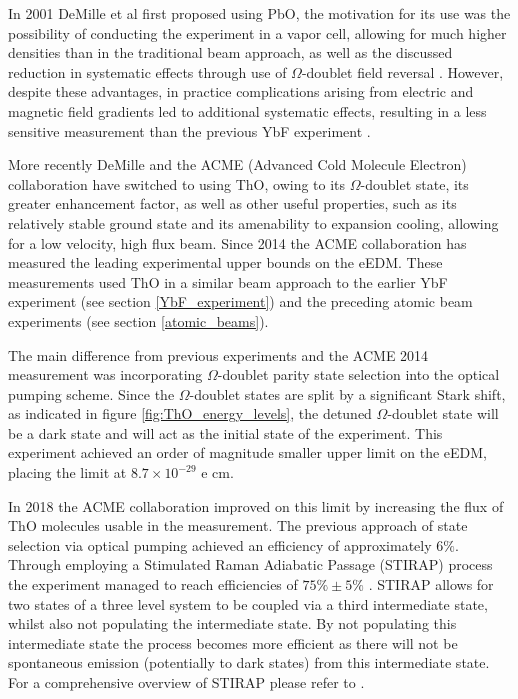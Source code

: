 In 2001 DeMille et al first proposed using PbO, the motivation for its use was the possibility of conducting the experiment in a vapor cell, allowing for much higher densities than in the traditional beam approach, as well as the discussed reduction in systematic effects through use of $\Omega$-doublet field reversal \cite{DeMille_2001}. However, despite these advantages, in practice complications arising from electric and magnetic field gradients led to additional systematic effects, resulting in a less sensitive measurement than the previous YbF experiment \cite{Eckel_2013}.

More recently DeMille and the ACME (Advanced Cold Molecule Electron) collaboration have switched to using ThO, owing to its $\Omega$-doublet state, its greater enhancement factor, as well as other useful properties, such as its relatively stable ground state and its amenability to expansion cooling, allowing for a low velocity, high flux beam. Since 2014 the ACME collaboration has measured the leading experimental upper bounds on the eEDM. These measurements used ThO in a similar beam approach to the earlier YbF experiment (see section \ref{YbF_experiment}) and the preceding atomic beam experiments (see section \ref{atomic_beams}).

The main difference from previous experiments and the ACME 2014 measurement \cite{ACME_2014} was incorporating $\Omega$-doublet parity state selection into the optical pumping scheme. Since the $\Omega$-doublet states are split by a significant Stark shift, as indicated in figure \ref{fig:ThO_energy_levels}, the detuned $\Omega$-doublet state will be a dark state and will act as the initial state of the experiment. This experiment achieved an order of magnitude smaller upper limit on the eEDM, placing the limit at $8.7 \times 10^{-29}$ e cm.

In 2018 the ACME collaboration improved on this limit by increasing the flux of ThO molecules usable in the measurement. The previous approach of state selection via optical pumping achieved an efficiency of approximately $6\%$. Through employing a Stimulated Raman Adiabatic Passage (STIRAP) process the experiment managed to reach efficiencies of $75\% \pm 5\%$ \cite{Panda_2016}. STIRAP allows for two states of a three level system to be coupled via a third intermediate state, whilst also not populating the intermediate state. By not populating this intermediate state the process becomes more efficient as there will not be spontaneous emission (potentially to dark states) from this intermediate state. For a comprehensive overview of STIRAP please refer to \cite{Vitanov_2017}.

